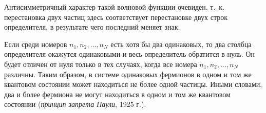 Антисимметричный характер такой волновой функции очевиден, т.~к. перестановка двух частиц здесь соответствует перестановке двух строк определителя, в результате чего последний меняет знак.

Если среди номеров $n_1, n_2, \dots, n_N$ есть хотя бы два одинаковых, то два столбца определителя окажутся одинаковыми и весь определитель обратится в нуль. Он будет отличен от нуля только в тех случаях, когда все номера $n_1, n_2, \dots, n_N$ различны. Таким образом, в системе одинаковых фермионов в одном и том же квантовом состоянии может находиться не более одной частицы. Иными словами, два и более фермиона не могут находиться в одном и том же квантовом состоянии ({\em принцип запрета Паули}, 1925 г.).

